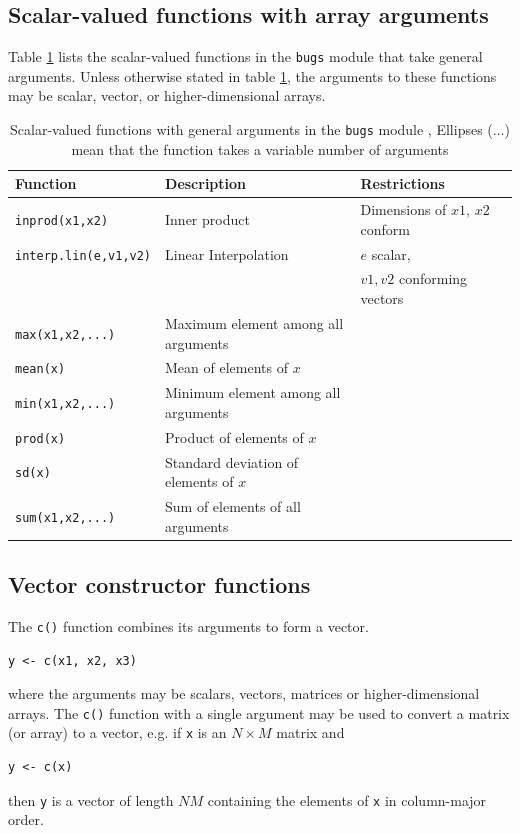 \documentclass[11pt, a4paper, titlepage]{report}
\begin{document}
\subsection{Scalar-valued functions with array arguments}

Table \ref{table:bugs:scalar2} lists the scalar-valued functions in the
\texttt{bugs} module that take general arguments. Unless otherwise
stated in table \ref{table:bugs:scalar2}, the arguments to these functions
may be scalar, vector, or higher-dimensional arrays.

\begin{table}
\begin{tabular}{lll}
\hline
Function & Description & Restrictions \\
\hline
\verb+inprod(x1,x2)+ & Inner product & Dimensions of $x1$, $x2$ conform \\
\verb+interp.lin(e,v1,v2)+ & Linear Interpolation & $e$ scalar, \\
                          &                     & $v1,v2$ conforming vectors \\
\verb+max(x1,x2,...)+ & Maximum element among all arguments & \\
\verb+mean(x)+  & Mean of elements of $x$ & \\
\verb+min(x1,x2,...)+ & Minimum element among all arguments & \\
\verb+prod(x)+  & Product of elements of $x$ & \\
\verb+sd(x)+    & Standard deviation of elements of $x$ & \\
\verb+sum(x1,x2,...)+   & Sum of elements of all arguments & \\
\hline
\end{tabular}
\caption{Scalar-valued functions with general
  arguments in the \texttt{bugs} module \label{table:bugs:scalar2},
  Ellipses ($\ldots$) mean that the function takes a variable number of
  arguments}
\end{table}

\subsection{Vector constructor functions}

The \verb+c()+ function combines its arguments to form a vector.
\begin{verbatim}
y <- c(x1, x2, x3)
\end{verbatim}
where the arguments may be scalars, vectors, matrices or
higher-dimensional arrays. The \verb+c()+ function with a single
argument may be used to convert a matrix (or array) to a vector, e.g.
if \texttt{x} is an $N \times M$ matrix and
\begin{verbatim}
y <- c(x)
\end{verbatim}
then \texttt{y} is a vector of length $NM$ containing the elements of
\texttt{x} in column-major order.
\end{document}
